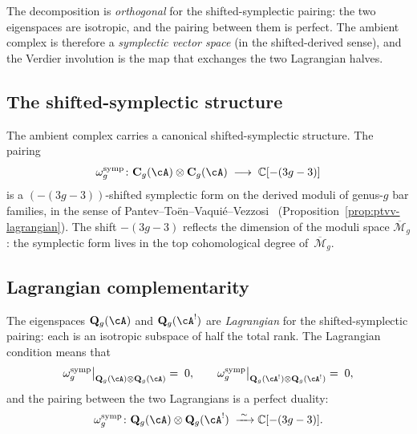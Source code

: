 The decomposition is \emph{orthogonal} for the shifted-symplectic
pairing: the two eigenspaces are isotropic, and the pairing between
them is perfect. The ambient complex is therefore a
\emph{symplectic vector space} (in the shifted-derived sense), and
the Verdier involution is the map that exchanges the two Lagrangian
halves.

\subsection{The shifted-symplectic structure}
\label{subsec:thqg-intro-shifted-symplectic}

The ambient complex carries a canonical shifted-symplectic structure.
The pairing
\begin{equation}\label{eq:thqg-intro-shifted-symplectic-pairing}
\omega_{g}^{\mathrm{symp}} \colon
\mathbf{C}_g(\cA) \otimes \mathbf{C}_g(\cA)
\;\longrightarrow\;
\mathbb{C}[-(3g-3)]
\end{equation}
is a $(-(3g-3))$-shifted symplectic form on the derived moduli of
genus-$g$ bar families, in the sense of
Pantev--To\"en--Vaqui\'e--Vezzosi~\cite{PTVV13}
\textup{(}Proposition~\ref{prop:ptvv-lagrangian}\textup{)}. The shift
$-(3g-3)$ reflects the dimension of the moduli space
$\overline{\mathcal{M}}_g$: the symplectic form lives in the top
cohomological degree of~$\overline{\mathcal{M}}_g$.

\subsection{Lagrangian complementarity}
\label{subsec:thqg-intro-lagrangian}

The eigenspaces $\mathbf{Q}_g(\cA)$ and $\mathbf{Q}_g(\cA^!)$ are
\emph{Lagrangian} for the shifted-symplectic pairing: each is an
isotropic subspace of half the total rank. The Lagrangian condition
means that
\begin{equation}\label{eq:thqg-intro-lagrangian-condition}
\omega_g^{\mathrm{symp}}\bigl|_{\mathbf{Q}_g(\cA) \otimes \mathbf{Q}_g(\cA)}
\;=\; 0,
\qquad
\omega_g^{\mathrm{symp}}\bigl|_{\mathbf{Q}_g(\cA^!) \otimes \mathbf{Q}_g(\cA^!)}
\;=\; 0,
\end{equation}
and the pairing between the two Lagrangians is a perfect duality:
\begin{equation}\label{eq:thqg-intro-lagrangian-perfect}
\omega_g^{\mathrm{symp}} \colon
\mathbf{Q}_g(\cA) \otimes \mathbf{Q}_g(\cA^!)
\;\xrightarrow{\;\sim\;}
\mathbb{C}[-(3g-3)].
\end{equation}

